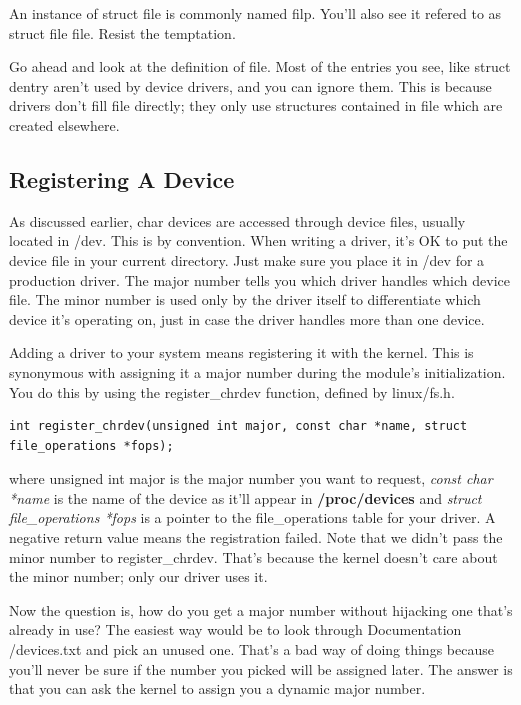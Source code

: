 \documentclass[11pt]{article}
\begin{document}
An instance of struct file is commonly named filp. You'll also see it refered to as struct file file. Resist the temptation.

Go ahead and look at the definition of file. Most of the entries you see, like struct dentry aren't used by device drivers, and you can ignore them. This is because drivers don't fill file directly; they only use structures contained in file which are created elsewhere.

\subsection{Registering A Device}
\label{sec:org1d7619f}
As discussed earlier, char devices are accessed through device files, usually located in /dev. This is by convention. When writing a driver, it's OK to put the device file in your current directory. Just make sure you place it in /dev for a production driver. The major number tells you which driver handles which device file. The minor number is used only by the driver itself to differentiate which device it's operating on, just in case the driver handles more than one device.

Adding a driver to your system means registering it with the kernel. This is synonymous with assigning it a major number during the module's initialization. You do this by using the register\_chrdev function, defined by linux/fs.h.

\begin{verbatim}
int register_chrdev(unsigned int major, const char *name, struct file_operations *fops);
\end{verbatim}

where unsigned int major is the major number you want to request, \emph{const char *name} is the name of the device as it'll appear in \textbf{/proc/devices} and \emph{struct file\_operations *fops} is a pointer to the file\_operations table for your driver. A negative return value means the registration failed. Note that we didn't pass the minor number to register\_chrdev. That's because the kernel doesn't care about the minor number; only our driver uses it.

Now the question is, how do you get a major number without hijacking one that's already in use? The easiest way would be to look through Documentation /devices.txt and pick an unused one. That's a bad way of doing things because you'll never be sure if the number you picked will be assigned later. The answer is that you can ask the kernel to assign you a dynamic major number.
\end{document}

